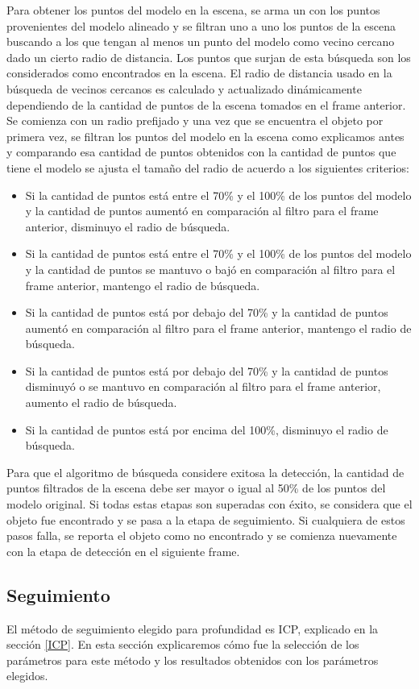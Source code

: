 Para obtener los puntos del modelo en la escena, se arma un \kdt con los puntos provenientes del modelo alineado y se filtran uno a uno los puntos de la escena buscando a los que tengan al menos un punto del modelo como vecino cercano dado un cierto radio de distancia. Los puntos que surjan de esta búsqueda son los considerados como encontrados en la escena. El radio de distancia usado en la búsqueda de vecinos cercanos es calculado y actualizado dinámicamente dependiendo de la cantidad de puntos de la escena tomados en el frame anterior. Se comienza con un radio prefijado y una vez que se encuentra el objeto por primera vez, se filtran los puntos del modelo en la escena como explicamos antes y comparando esa cantidad de puntos obtenidos con la cantidad de puntos que tiene el modelo se ajusta el tamaño del radio de acuerdo a los siguientes criterios:
\begin{itemize}
	\item Si la cantidad de puntos está entre el 70\% y el 100\% de los puntos del modelo y la cantidad de puntos aumentó en comparación al filtro para el frame anterior, disminuyo el radio de búsqueda.
	\item Si la cantidad de puntos está entre el 70\% y el 100\% de los puntos del modelo y la cantidad de puntos se mantuvo o bajó en comparación al filtro para el frame anterior, mantengo el radio de búsqueda.
	\item Si la cantidad de puntos está por debajo del 70\% y la cantidad de puntos aumentó en comparación al filtro para el frame anterior, mantengo el radio de búsqueda.
	\item Si la cantidad de puntos está por debajo del 70\% y la cantidad de puntos disminuyó o se mantuvo en comparación al filtro para el frame anterior, aumento el radio de búsqueda.
	\item Si la cantidad de puntos está por encima del 100\%, disminuyo el radio de búsqueda.
\end{itemize}

Para que el algoritmo de búsqueda considere exitosa la detección, la cantidad de puntos filtrados de la escena debe ser mayor o igual al 50\% de los puntos del modelo original. Si todas estas etapas son superadas con éxito, se considera que el objeto fue encontrado y se pasa a la etapa de seguimiento. Si cualquiera de estos pasos falla, se reporta el objeto como no encontrado y se comienza nuevamente con la etapa de detección en el siguiente frame.

\subsection{Seguimiento}\label{tracking_d}
El método de seguimiento elegido para profundidad es ICP, explicado en la sección \ref{ICP}. En esta sección explicaremos cómo fue la selección de los parámetros para este método y los resultados obtenidos con los parámetros elegidos.

